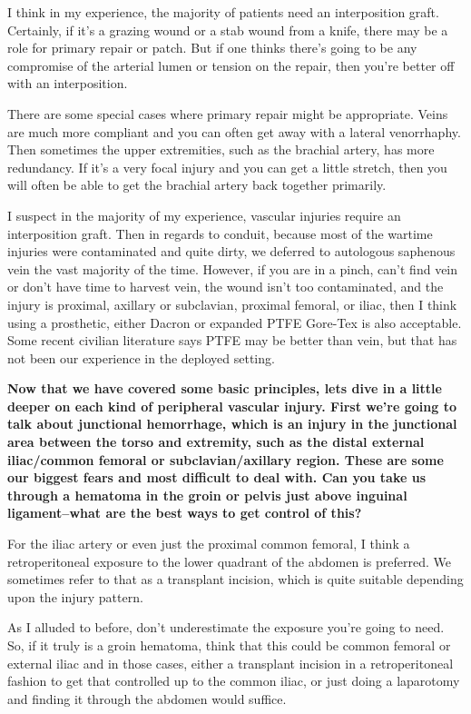 \documentclass[
]{book}
\begin{document}
I think in my experience, the majority of patients need an interposition
graft. Certainly, if it's a grazing wound or a stab wound from a knife,
there may be a role for primary repair or patch. But if one thinks
there's going to be any compromise of the arterial lumen or tension on
the repair, then you're better off with an interposition. \citep{liang2016, fox2012}

There are some special cases where primary repair might be appropriate.
Veins are much more compliant and you can often get away with a lateral
venorrhaphy. Then sometimes the upper extremities, such as the brachial
artery, has more redundancy. If it's a very focal injury and you can get
a little stretch, then you will often be able to get the brachial artery
back together primarily.

I suspect in the majority of my experience, vascular injuries require an
interposition graft. Then in regards to conduit, because most of the
wartime injuries were contaminated and quite dirty, we deferred to
autologous saphenous vein the vast majority of the time. However, if you
are in a pinch, can't find vein or don't have time to harvest vein, the
wound isn't too contaminated, and the injury is proximal, axillary or
subclavian, proximal femoral, or iliac, then I think using a prosthetic,
either Dacron or expanded PTFE Gore-Tex is also acceptable. Some recent
civilian literature says PTFE may be better than vein, but that has not
been our experience in the deployed setting.

\textbf{Now that we have covered some basic principles, lets dive in a little
deeper on each kind of peripheral vascular injury. First we're going to
talk about junctional hemorrhage, which is an injury in the junctional
area between the torso and extremity, such as the distal external
iliac/common femoral or subclavian/axillary region. These are some our
biggest fears and most difficult to deal with. Can you take us through a
hematoma in the groin or pelvis just above inguinal ligament--what are
the best ways to get control of this?}

For the iliac artery or even just the proximal common femoral, I think a
retroperitoneal exposure to the lower quadrant of the abdomen is
preferred. We sometimes refer to that as a transplant incision, which is
quite suitable depending upon the injury pattern.

As I alluded to before, don't underestimate the exposure you're going to
need. So, if it truly is a groin hematoma, think that this could be
common femoral or external iliac and in those cases, either a transplant
incision in a retroperitoneal fashion to get that controlled up to the
common iliac, or just doing a laparotomy and finding it through the
abdomen would suffice.
\end{document}
